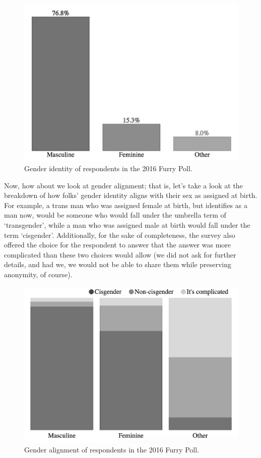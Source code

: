 \begin{figure}
  \centering
  \includegraphics[scale=0.65]{assets/identity}
  \caption{Gender identity of respondents in the 2016 Furry Poll.}
  \label{fig:identity}
\end{figure}

Now, how about we look at gender alignment; that is, let's take a look at the breakdown of how folks' gender identity aligns with their sex as assigned at birth.  For example, a trans man who was assigned female at birth, but identifies as a man now, would be someone who would fall under the umbrella term of `transgender', while a man who was assigned male at birth would fall under the term `cisgender'.  Additionally, for the sake of completeness, the survey also offered the choice for the respondent to answer that the answer was more complicated than these two choices would allow (we did not ask for further details, and had we, we would not be able to share them while preserving anonymity, of course).

\begin{figure}
  \centering
  \includegraphics[scale=0.65]{assets/alignment}
  \caption{Gender alignment of respondents in the 2016 Furry Poll.}
  \label{fig:alignment}
\end{figure}

